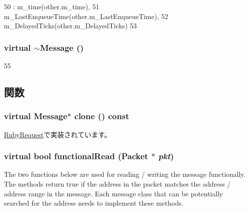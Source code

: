 \begin{DoxyCode}
50         : m_time(other.m_time),
51           m_LastEnqueueTime(other.m_LastEnqueueTime),
52           m_DelayedTicks(other.m_DelayedTicks)
53     { }
\end{DoxyCode}
\hypertarget{classMessage_adf3bb2d667e5391d55d9e711cdbf7da2}{
\subsubsection[{$\sim$Message}]{\setlength{\rightskip}{0pt plus 5cm}virtual $\sim${\bf Message} ()}}
\label{classMessage_adf3bb2d667e5391d55d9e711cdbf7da2}



\begin{DoxyCode}
55 { }
\end{DoxyCode}


\subsection{関数}
\hypertarget{classMessage_a78f6e5c1dc41f5316e10bba31ee0d8a1}{
\subsubsection[{clone}]{\setlength{\rightskip}{0pt plus 5cm}virtual {\bf Message}$\ast$ clone () const}}
\label{classMessage_a78f6e5c1dc41f5316e10bba31ee0d8a1}


\hyperlink{classRubyRequest_a2589cd17f2bbc4a7cd72c3996d880819}{RubyRequest}で実装されています。\hypertarget{classMessage_a050cc08996aae4295aee40e8871788b7}{
\subsubsection[{functionalRead}]{\setlength{\rightskip}{0pt plus 5cm}virtual bool functionalRead ({\bf Packet} $\ast$ {\em pkt})}}
\label{classMessage_a050cc08996aae4295aee40e8871788b7}
The two functions below are used for reading / writing the message functionally. The methods return true if the address in the packet matches the address / address range in the message. Each message class that can be potentially searched for the address needs to implement these methods. 

